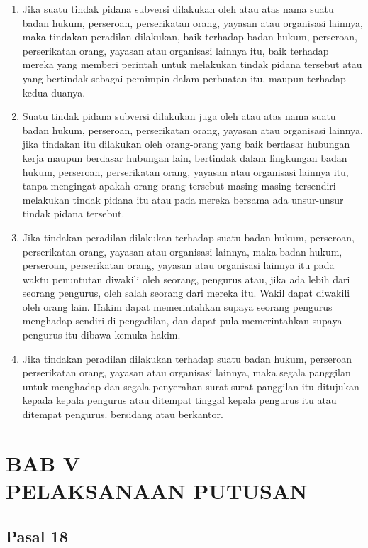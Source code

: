\documentclass{article}
\begin{document}
\begin{enumerate}
\item Jika suatu tindak pidana subversi dilakukan oleh atau atas nama suatu badan hukum, perseroan,
perserikatan orang, yayasan atau organisasi lainnya, maka tindakan peradilan dilakukan, baik
terhadap badan hukum, perseroan, perserikatan orang, yayasan atau organisasi lainnya itu, baik
terhadap mereka yang memberi perintah untuk melakukan tindak pidana tersebut atau yang bertindak
sebagai pemimpin dalam perbuatan itu, maupun terhadap kedua-duanya.
\item Suatu tindak pidana subversi dilakukan juga oleh atau atas nama suatu badan hukum, perseroan,
perserikatan orang, yayasan atau organisasi lainnya, jika tindakan itu dilakukan oleh orang-orang
yang baik berdasar hubungan kerja maupun berdasar hubungan lain, bertindak dalam lingkungan
badan hukum, perseroan, perserikatan orang, yayasan atau organisasi lainnya itu, tanpa mengingat
apakah orang-orang tersebut masing-masing tersendiri melakukan tindak pidana itu atau pada mereka
bersama ada unsur-unsur tindak pidana tersebut.
\item Jika tindakan peradilan dilakukan terhadap suatu badan hukum, perseroan, perserikatan orang,
yayasan atau organisasi lainnya, maka badan hukum, perseroan, perserikatan orang, yayasan atau
organisasi lainnya itu pada waktu penuntutan diwakili oleh seorang, pengurus atau, jika ada lebih dari
seorang pengurus, oleh salah seorang dari mereka itu.
Wakil dapat diwakili oleh orang lain. Hakim dapat memerintahkan supaya seorang pengurus
menghadap sendiri di pengadilan, dan dapat pula memerintahkan supaya pengurus itu dibawa
kemuka hakim.
\item Jika tindakan peradilan dilakukan terhadap suatu badan hukum, perseroan perserikatan orang,
yayasan atau organisasi lainnya, maka segala panggilan untuk menghadap dan segala penyerahan
surat-surat panggilan itu ditujukan kepada kepala pengurus atau ditempat tinggal kepala pengurus itu
atau ditempat pengurus. bersidang atau berkantor.
\end{enumerate}

\section*{\centering{}BAB V\\PELAKSANAAN PUTUSAN}

\subsection*{\centering{}Pasal 18}
\end{document}
